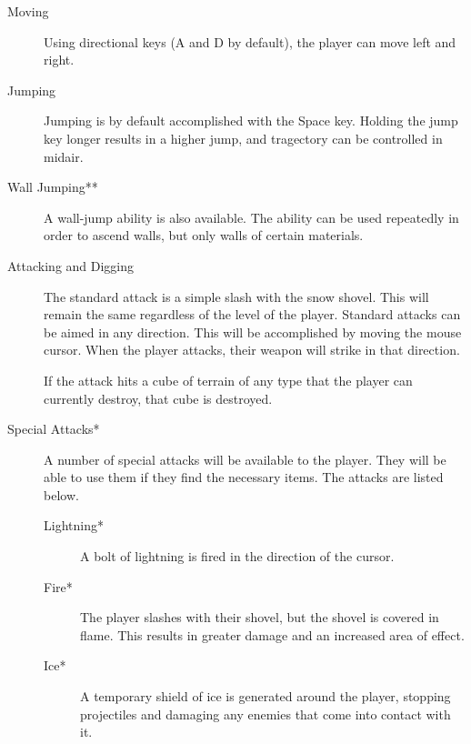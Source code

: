 \documentclass{article}
\begin{document}
\begin{description}

\item[Moving]

Using directional keys (A and D by default), the player can move left and right.%

\item[Jumping]
Jumping is by default accomplished with the Space key.  Holding the jump key longer results in a higher jump, and tragectory can be controlled in midair.

\item[Wall Jumping**]

A wall-jump ability is also available.  The ability can be used repeatedly in order to ascend walls, but only walls of certain materials. %

\item[Attacking and Digging]

The standard attack is a simple slash with the snow shovel.  This will remain the same regardless of the level of the player.  Standard attacks can be aimed in any direction.  This will be accomplished by moving the mouse cursor.  When the player attacks, their weapon will strike in that direction.

If the attack hits a cube of terrain of any type that the player can currently destroy, that cube is destroyed.

\item[Special Attacks*]

A number of special attacks will be available to the player.  They will be able to use them if they find the necessary items.  The attacks are listed below.


\begin{description}

\item[Lightning*]

A bolt of lightning is fired in the direction of the cursor.

\item[Fire*]

The player slashes with their shovel, but the shovel is covered in flame.  This results in greater damage and an increased area of effect.

\item[Ice*]

A temporary shield of ice is generated around the player, stopping projectiles and damaging any enemies that come into contact with it.

\end{description}


\end{description}
\end{document}
